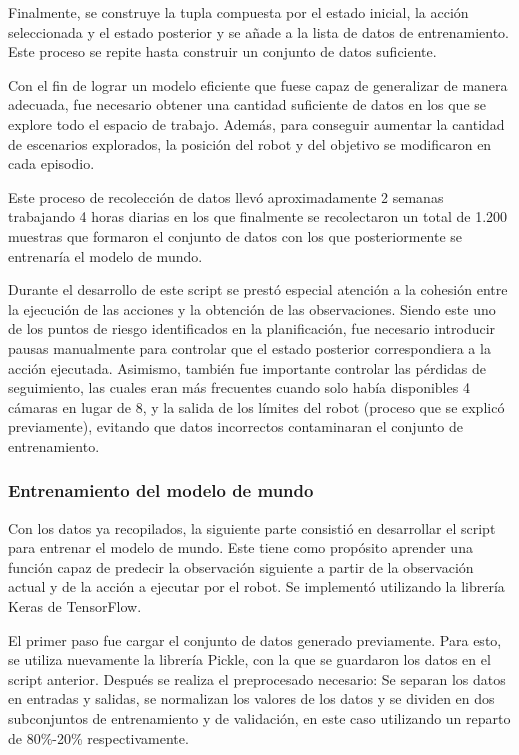 Finalmente, se construye la tupla compuesta por el estado inicial, la acción seleccionada y el estado posterior y se añade a la lista de datos de entrenamiento. Este proceso se repite hasta 
construir un conjunto de datos suficiente.

Con el fin de lograr un modelo eficiente que fuese capaz de generalizar de manera adecuada, fue necesario obtener una cantidad suficiente de datos en los que se explore todo el espacio de 
trabajo. Además, para conseguir aumentar la cantidad de escenarios explorados, la posición del robot y del objetivo se modificaron en cada episodio.

Este proceso de recolección de datos llevó aproximadamente 2 semanas trabajando 4 horas diarias en los que finalmente se recolectaron un total de 1.200 muestras que formaron el conjunto de 
datos con los que posteriormente se entrenaría el modelo de mundo.

Durante el desarrollo de este \gls{script} se prestó especial atención a la cohesión entre la ejecución de las acciones y la obtención de las observaciones. Siendo este uno de los puntos 
de riesgo identificados en la planificación, fue necesario introducir pausas manualmente para controlar que el estado posterior correspondiera a la acción ejecutada. Asimismo, también fue 
importante controlar las pérdidas de seguimiento, las cuales eran más frecuentes cuando solo había disponibles 4 cámaras en lugar de 8, y la salida de los límites del robot (proceso que 
se explicó previamente), evitando que datos incorrectos contaminaran el conjunto de entrenamiento.


\subsubsection{Entrenamiento del modelo de mundo}

Con los datos ya recopilados, la siguiente parte consistió en desarrollar el \gls{script} para entrenar el modelo de mundo. Este tiene como propósito aprender una función capaz de predecir la 
observación siguiente a partir de la observación actual y de la acción a ejecutar por el robot. Se implementó utilizando la librería Keras de TensorFlow.

El primer paso fue cargar el conjunto de datos generado previamente. Para esto, se utiliza nuevamente la librería Pickle, con la que se guardaron los datos en el \gls{script} anterior. Después 
se realiza el preprocesado necesario: Se separan los datos en entradas y salidas, se normalizan los valores de los datos y se dividen en dos subconjuntos de entrenamiento y de validación, en 
este caso utilizando un reparto de 80\%-20\% respectivamente.

